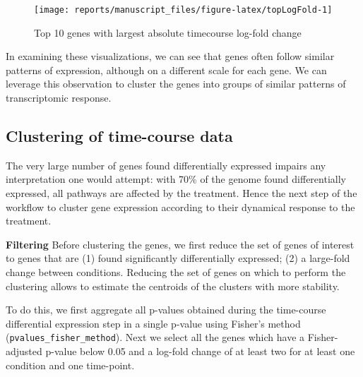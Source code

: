 \documentclass[9pt,a4paper,]{extarticle}
\begin{document}
\begin{figure}[H]

{\centering \texttt{[image: reports/manuscript\_files/figure-latex/topLogFold-1]} 

}

\caption{Top 10 genes with largest absolute timecourse log-fold change}\label{fig:topLogFold}
\end{figure}

In examining these visualizations, we can see that genes often follow similar
patterns of expression, although on a different scale for each gene. We can
leverage this observation to cluster the genes into groups of similar patterns
of transcriptomic response.

\hypertarget{clustering-of-time-course-data}{%
\subsection{Clustering of time-course data}\label{clustering-of-time-course-data}}

The very large number of genes found differentially expressed impairs any
interpretation one would attempt: with 70\% of the genome found differentially
expressed, all pathways are affected by the treatment. Hence the next step of
the workflow to cluster gene expression according to their dynamical response
to the treatment.

\textbf{Filtering} Before clustering the genes, we first reduce the set of
genes of interest to genes that are (1) found significantly differentially
expressed; (2) a large-fold change between conditions. Reducing the set of genes on which to perform the clustering allows to
estimate the centroids of the clusters with more stability.

To do this, we first
aggregate all p-values obtained during the time-course differential expression
step in a single p-value using Fisher's method \citep{fisher:statistical} (\texttt{pvalues\_fisher\_method}).
Next we
select all the genes which have a Fisher-adjusted p-value below 0.05 and a log-fold
change of at least two for at least one condition and one time-point.
\end{document}
